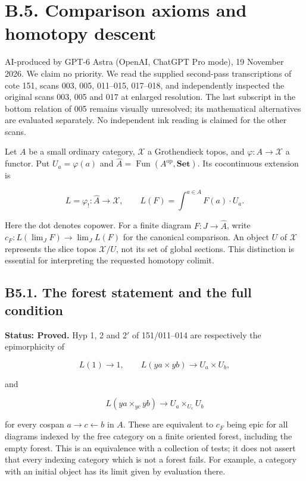 \section{B.5. Comparison axioms and homotopy descent}\label{b.5.-comparison-axioms-and-homotopy-descent}

AI-produced by GPT-6 Astra (OpenAI, ChatGPT Pro mode), 19 November 2026.
We claim no priority. We read the supplied second-pass transcriptions of
cote 151, scans 003, 005, 011--015, 017--018, and independently inspected
the original scans 003, 005 and 017 at enlarged resolution. The last
subscript in the bottom relation of 005 remains visually unresolved;
its mathematical alternatives are evaluated separately. No independent
ink reading is claimed for the other scans.

Let \(A\) be a small ordinary category, \(\mathcal X\) a Grothendieck
topos, and \(\varphi:A\to\mathcal X\) a functor. Put \(U_a=\varphi(a)\)
and \(\widehat A=\operatorname{Fun}(A^{\mathrm{op}},\mathbf{Set})\). Its
cocontinuous extension is

\[L=\varphi_!: \widehat A\to\mathcal X,\qquad L(F)=\int^{a\in A}F(a)\cdot U_a.\]

Here the dot denotes copower. For a finite diagram \(F:J\to\widehat A\),
write \(c_F:L(\lim_JF)\to\lim_JL(F)\) for the canonical comparison. An
object \(U\) of \(\mathcal X\) represents the slice topos
\(\mathcal X/U\), not its set of global sections. This distinction is
essential for interpreting the requested homotopy colimit.

\subsection{B5.1. The forest statement and the full
condition}\label{b5.1.-the-forest-statement-and-the-full-condition}

\textbf{Status: Proved.} Hyp 1, 2 and \(2'\) of 151/011--014 are
respectively the epimorphicity of

\[L(1)\to1,\qquad L(ya\times yb)\to U_a\times U_b,\]

and

\[L(ya\times_{yc}yb)\to U_a\times_{U_c}U_b\]

for every cospan \(a\to c\leftarrow b\) in \(A\). These are equivalent
to \(c_F\) being epic for all diagrams indexed by the free category on a
finite oriented forest, including the empty forest. This is an
equivalence with a collection of tests; it does not assert that every
indexing category which is not a forest fails. For example, a category
with an initial object has its limit given by evaluation there.

